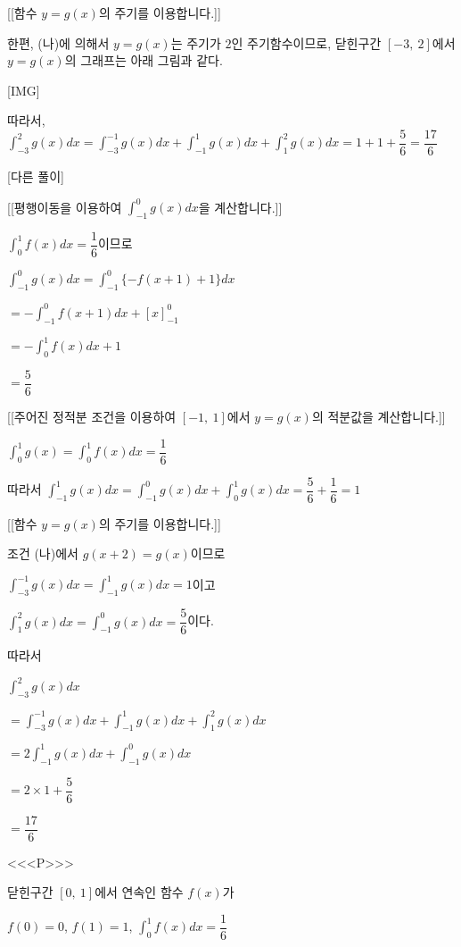\documentclass{oblivoir}
\begin{document}
[[함수 $y=g(x)$의 주기를 이용합니다.]]

한편, (나)에 의해서 $y=g(x)$는 주기가 $2$인 주기함수이므로, 닫힌구간 $[-3,\: 2]$에서 $y=g(x)$의 그래프는 아래 그림과 같다.

[IMG]

따라서, $\displaystyle\int_{-3}^{2}g(x)dx =\displaystyle\int_{-3}^{-1}g(x)dx +\displaystyle\int_{-1}^{1}g(x)dx +\displaystyle\int_{1}^{2}g(x)dx=1+1+\dfrac{5}{6}=\dfrac{17}{6}$

[다른 풀이]

[[평행이동을 이용하여 $\displaystyle\int_{-1}^{0}g(x)dx$을 계산합니다.]]

$\displaystyle\int_{0}^{1}f(x)dx =\dfrac{1}{6}$이므로 

$\displaystyle\int_{-1}^{0}g(x)dx$$=\displaystyle\int_{-1}^{0}\{-f(x+1)+1\}dx$

$=-\displaystyle\int_{-1}^{0}f(x+1)dx +[x]_{-1}^{0}$

$=-\displaystyle\int_{0}^{1}f(x)dx +1$

$=\dfrac{5}{6}$

[[주어진 정적분 조건을 이용하여 $[-1,\:1]$에서 $y=g(x)$의 적분값을 계산합니다.]]

$\displaystyle\int_{0}^{1}g(x)$$=\displaystyle\int_{0}^{1}f(x)dx$$=\dfrac{1}{6}$

따라서 $\displaystyle\int_{-1}^{1}g(x)dx$$=\displaystyle\int_{-1}^{0}g(x)dx+\displaystyle\int_{0}^{1}g(x)dx$$=\dfrac{5}{6}+\dfrac{1}{6}=1$

[[함수 $y=g(x)$의 주기를 이용합니다.]]

조건 (나)에서 $g(x+2)=g(x)$이므로

$\displaystyle\int_{-3}^{-1}g(x)dx=\displaystyle\int_{-1}^{1}g(x)dx=1$이고

$\displaystyle\int_{1}^{2}g(x)dx=\displaystyle\int_{-1}^{0}g(x)dx =\dfrac{5}{6}$이다.

따라서

$\displaystyle\int_{-3}^{2}g(x)dx$

$=\displaystyle\int_{-3}^{-1}g(x)dx+\displaystyle\int_{-1}^{1}g(x)dx+\displaystyle\int_{1}^{2}g(x)dx$

$=2\displaystyle\int_{-1}^{1}g(x)dx+\displaystyle\int_{-1}^{0}g(x)dx$

$=2\times 1+\dfrac{5}{6}$

$=\dfrac{17}{6}$

<<<P>>>

닫힌구간 $[0,\:1]$에서 연속인 함수 $f(x)$가

$f(0)=0$,  $f(1)=1$,  $\displaystyle\int_{0}^{1}f(x)dx =\dfrac{1}{6}$
\end{document}
